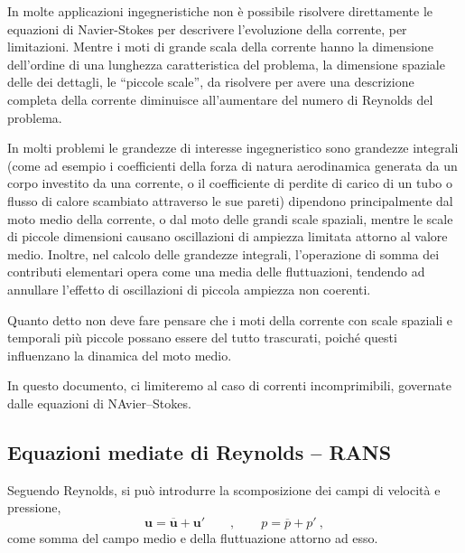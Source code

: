 In molte applicazioni ingegneristiche non è possibile risolvere direttamente le equazioni di Navier-Stokes per descrivere l'evoluzione della corrente, per limitazioni. Mentre i moti di grande scala della corrente hanno la dimensione dell'ordine di una lunghezza caratteristica del problema, la dimensione spaziale delle dei dettagli, le ``piccole scale'', da risolvere per avere una descrizione completa della corrente diminuisce all'aumentare del numero di Reynolds del problema.

In molti problemi le grandezze di interesse ingegneristico sono grandezze integrali (come ad esempio i coefficienti della forza di natura aerodinamica generata da un corpo investito da una corrente, o il coefficiente di perdite di carico di un tubo o flusso di calore scambiato attraverso le sue pareti) dipendono principalmente dal moto medio della corrente, o dal moto delle grandi scale spaziali, mentre le scale di piccole dimensioni causano oscillazioni di ampiezza limitata attorno al valore medio. Inoltre, nel calcolo delle grandezze integrali, l'operazione di somma dei contributi elementari opera come una media delle fluttuazioni, tendendo ad annullare l'effetto di oscillazioni di piccola ampiezza non coerenti.

Quanto detto non deve fare pensare che i moti della corrente con scale spaziali e temporali più piccole possano essere del tutto trascurati, poiché questi influenzano la dinamica del moto medio.

In questo documento, ci limiteremo al caso di correnti incomprimibili, governate dalle equazioni di NAvier--Stokes.

\subsection{Equazioni mediate di Reynolds -- RANS}
Seguendo Reynolds, si può introdurre la scomposizione dei campi di velocità e pressione,
\begin{equation}
 \bm{u} = \overline{\bm{u}} + \bm{u}' \qquad , \qquad  p = \overline{p} + p' \ ,
\end{equation}
come somma del campo medio e della fluttuazione attorno ad esso.

